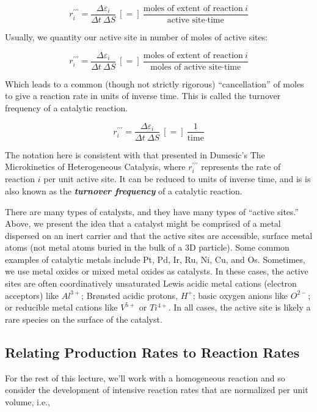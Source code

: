 \documentclass[11pt]{article}
\begin{document}
\[r_i^{\prime\prime\prime} = \frac{\Delta \varepsilon_i}{\Delta t \ \Delta S} \ [=] \ \frac{\text{moles of extent of reaction} \ i}{\text{active site} \cdot \text{time}}\]

Usually, we quantity our active site in number of moles of active sites:

\[r_i^{\prime\prime\prime} = \frac{\Delta \varepsilon_i}{\Delta t \ \Delta S} \ [=] \ \frac{\text{moles of extent of reaction} \ i}{\text{moles of active site} \cdot \text{time}}\]

Which leads to a common (though not strictly rigorous) ``cancellation''
of moles to give a reaction rate in units of inverse time. This is
called the turnover frequency of a catalytic reaction.

\[r_i^{\prime\prime\prime} = \frac{\Delta \varepsilon_i}{\Delta t \ \Delta S} \ [=] \ \frac{\text{1}}{\text{time}}\]

The notation here is consistent with that presented in Dumesic's The
Microkinetics of Heterogeneous Catalysis, where
\(r_i^{\prime\prime\prime}\) represents the rate of reaction \(i\) per
unit active site. It can be reduced to units of inverse time, and is is
also known as the \textbf{\emph{turnover frequency}} of a catalytic
reaction.

There are many types of catalysts, and they have many types of ``active
sites.'' Above, we present the idea that a catalyst might be comprised
of a metal dispersed on an inert carrier and that the active sites are
accessible, surface metal atoms (not metal atoms buried in the bulk of a
3D particle). Some common examples of catalytic metals include Pt, Pd,
Ir, Ru, Ni, Cu, and Os. Sometimes, we use metal oxides or mixed metal
oxides as catalysts. In these cases, the active sites are often
coordinatively unsaturated Lewis acidic metal cations (electron
acceptors) like \(Al^{3+}\); Brønsted acidic protons, \(H^{+}\); basic
oxygen anions like \(O^{2-}\); or reducible metal cations like
\(V^{5+}\) or \(Ti^{4+}\). In all cases, the active site is likely a
rare species on the surface of the catalyst.

    \hypertarget{relating-production-rates-to-reaction-rates}{%
\subsection{Relating Production Rates to Reaction
Rates}\label{relating-production-rates-to-reaction-rates}}

For the rest of this lecture, we'll work with a homogeneous reaction and
so consider the development of intensive reaction rates that are
normalized per unit volume, i.e.,
\end{document}
